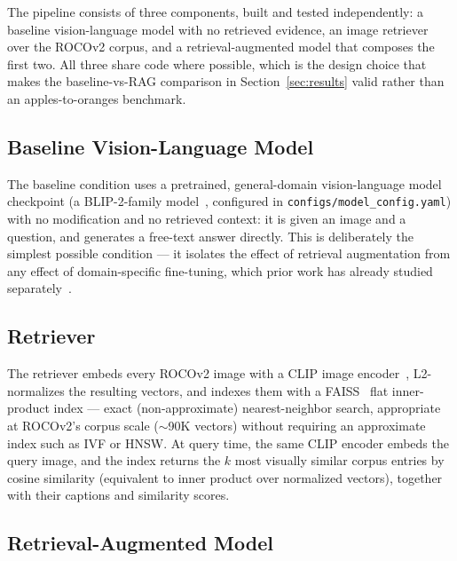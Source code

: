 The pipeline consists of three components, built and tested independently:
a baseline vision-language model with no retrieved evidence, an image
retriever over the ROCOv2 corpus, and a retrieval-augmented model that
composes the first two. All three share code where possible, which is the
design choice that makes the baseline-vs-RAG comparison in
Section~\ref{sec:results} valid rather than an apples-to-oranges
benchmark.

\subsection{Baseline Vision-Language Model}

The baseline condition uses a pretrained, general-domain vision-language
model checkpoint (a BLIP-2-family model~\cite{li2023blip2}, configured in
\texttt{configs/model\_config.yaml}) with no modification and no retrieved
context: it is given an image and a question, and generates a free-text
answer directly. This is deliberately the simplest possible condition ---
it isolates the effect of retrieval augmentation from any effect of
domain-specific fine-tuning, which prior work has already studied
separately~\cite{li2023llavamed}.

\subsection{Retriever}

The retriever embeds every ROCOv2 image with a CLIP
image encoder~\cite{radford2021clip}, L2-normalizes the resulting vectors,
and indexes them with a FAISS~\cite{johnson2019faiss} flat inner-product
index --- exact (non-approximate) nearest-neighbor search, appropriate at
ROCOv2's corpus scale ($\sim$90K vectors) without requiring an approximate
index such as IVF or HNSW. At query time, the same CLIP encoder embeds the
query image, and the index returns the $k$ most visually similar corpus
entries by cosine similarity (equivalent to inner product over normalized
vectors), together with their captions and similarity scores.

\subsection{Retrieval-Augmented Model}

